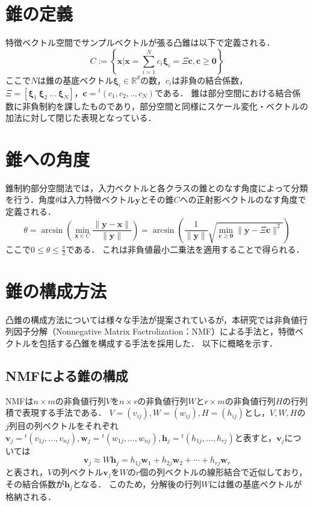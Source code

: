 \section{錐の定義}
特徴ベクトル空間でサンプルベクトルが張る凸錐は以下で定義される．
\begin{equation}
	C:=\left\{\bm x|\bm x=\sum_{i=1}^{N}c_i\bm \xi_i=\Xi\bm c, \bm c\geq \bm 0\right\}
\end{equation}
ここで$N$は錐の基底ベクトル$\bm \xi_i\in\mathbb{R}^d$の数，$c_i$は非負の結合係数，$\Xi=[\bm \xi_1~\bm \xi_2~...~\bm \xi_N]$，$\bm c={}^t(c_1, c_2,.., c_N)$である．
錐は部分空間における結合係数に非負制約を課したものであり，部分空間と同様にスケール変化・ベクトルの加法に対して閉じた表現となっている．

\section{錐への角度}
錐制約部分空間法では，入力ベクトルと各クラスの錐とのなす角度によって分類を行う．角度$\theta$は入力特徴ベクトル$\bm y$とその錐$C$への正射影ベクトルのなす角度で定義される．
\begin{equation}
	\theta = \arcsin\left(\min_{\bm x\in C}\frac{\|\bm y-\bm x\|}{\|\bm y\|}\right)=\arcsin\left(\frac{1}{\|\bm y\|}\sqrt{\min_{\bm c\geq \bm 0}\|\bm y-\Xi\bm c\|^2}\right)
\end{equation}
ここで$0\leq\theta\leq\frac{\pi}{2}$である．
これは非負値最小二乗法を適用することで得られる．

\section{錐の構成方法}
凸錐の構成方法については様々な手法が提案されている\cite{cone-sub}が，本研究では非負値行列因子分解（Nonnegative Matrix Factrolization：NMF）\cite{nmf}による手法と，特徴ベクトルを包括する凸錐を構成する手法を採用した．
以下に概略を示す．
\subsection{NMFによる錐の構成}
NMFは$n\times m$の非負値行列$V$を$n\times r$の非負値行列$W$と$r\times m$の非負値行列$H$の行列積で表現する手法である．
$V=(v_{ij}),W=(w_{ij}),H=(h_{ij})$とし，$V,W,H$の$j$列目の列ベクトルをそれぞれ$\bm v_j={}^t(v_{1j}, ..., v_{nj}),\bm w_j={}^t(w_{1j}, ..., w_{nj}),\bm h_j={}^t(h_{1j}, ..., h_{rj})$と表すと，$\bm v_j$については
\begin{equation}
	\bm v_j\approx W\bm h_j=h_{1j}\bm w_{1}+h_{2j}\bm w_2+\cdots+h_{rj}\bm w_{r}
\end{equation}
と表され，$V$の列ベクトル$\bm v_j$を$W$の$r$個の列ベクトルの線形結合で近似しており，その結合係数が$\bm h_j$となる．
このため，分解後の行列$W$には錐の基底ベクトルが格納される．

